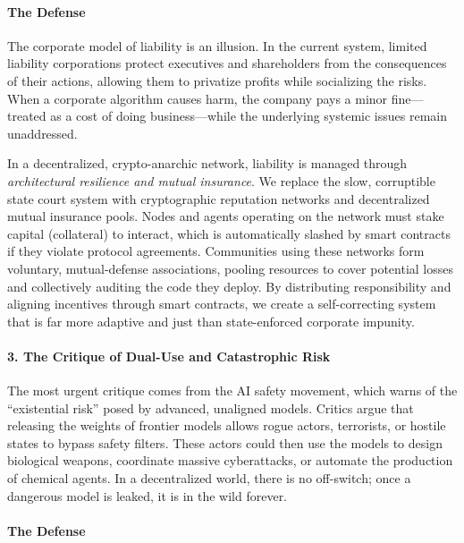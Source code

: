 \paragraph{The Defense}\label{the-defense-1}

The corporate model of liability is an illusion. In the current system,
limited liability corporations protect executives and shareholders from
the consequences of their actions, allowing them to privatize profits
while socializing the risks. When a corporate algorithm causes harm, the
company pays a minor fine---treated as a cost of doing business---while
the underlying systemic issues remain unaddressed.

In a decentralized, crypto-anarchic network, liability is managed
through \emph{architectural resilience and mutual insurance}. We replace
the slow, corruptible state court system with cryptographic reputation
networks and decentralized mutual insurance pools. Nodes and agents
operating on the network must stake capital (collateral) to interact,
which is automatically slashed by smart contracts if they violate
protocol agreements. Communities using these networks form voluntary,
mutual-defense associations, pooling resources to cover potential losses
and collectively auditing the code they deploy. By distributing
responsibility and aligning incentives through smart contracts, we
create a self-correcting system that is far more adaptive and just than
state-enforced corporate impunity.

\paragraph{3. The Critique of Dual-Use and Catastrophic
Risk}\label{the-critique-of-dual-use-and-catastrophic-risk}

The most urgent critique comes from the AI safety movement, which warns
of the ``existential risk'' posed by advanced, unaligned models. Critics
argue that releasing the weights of frontier models allows rogue actors,
terrorists, or hostile states to bypass safety filters. These actors
could then use the models to design biological weapons, coordinate
massive cyberattacks, or automate the production of chemical agents. In
a decentralized world, there is no off-switch; once a dangerous model is
leaked, it is in the wild forever.

\paragraph{The Defense}\label{the-defense-2}

